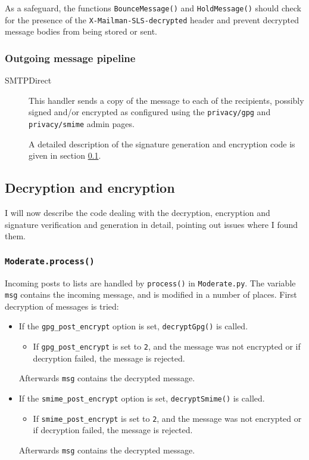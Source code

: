 \documentclass[a4]{article}
\newcommand{\file}[1]{\texttt{#1}}
\newcommand{\var}[1]{\texttt{#1}}
\newcommand{\val}[1]{\texttt{#1}}
\newcommand{\func}[1]{\texttt{#1()}}
\newcommand{\hdr}[1]{\texttt{#1}}
\newcommand{\page}[1]{\nolinkurl{#1}}
\begin{document}
As a safeguard, the functions \func{BounceMessage} and \func{HoldMessage}
should check for the presence of the \hdr{X-Mailman-SLS-decrypted} header and
prevent decrypted message bodies from being stored or sent.

\subsubsection{Outgoing message pipeline}\label{sec:outgoingpipeline}

\begin{description}
\item[SMTPDirect]
This handler sends a copy of the message to each of the recipients,
possibly signed and/or encrypted
as configured using the \page{privacy/gpg} and \page{privacy/smime} admin pages.

A detailed description of the signature generation and encryption code is given in section \ref{sec:crypto}.
\end{description}

\subsection{Decryption and encryption}\label{sec:crypto}

I will now describe the code dealing with the decryption, encryption and signature verification and generation in detail,
pointing out issues where I found them.

\subsubsection{\func{Moderate.process}}\label{sec:moderate}

Incoming posts to lists are handled by \func{process} in \file{Moderate.py}.
The variable \var{msg} contains the incoming message, and is modified in a number of places.
First decryption of messages is tried:

\begin{itemize}
\item If the \var{gpg\_post\_encrypt} option is set, \func{decryptGpg} is called.
  \begin{itemize}
  \item If \var{gpg\_post\_encrypt} is set to \val{2},
        and the message was not encrypted or if decryption failed,
        the message is rejected.
  \end{itemize}
  Afterwards \var{msg} contains the decrypted message.

\item If the \var{smime\_post\_encrypt} option is set, \func{decryptSmime} is called.
  \begin{itemize}
  \item If \var{smime\_post\_encrypt} is set to \val{2},
        and the message was not encrypted or if decryption failed,
        the message is rejected.
  \end{itemize}
  Afterwards \var{msg} contains the decrypted message.
\end{itemize}
\end{document}
